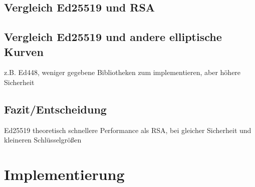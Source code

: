 \documentclass[thesis=bachelor,faculty=cb]{hsmw-thesis}
\begin{document}
\section{Vergleich Ed25519 und RSA}
\section{Vergleich Ed25519 und andere elliptische Kurven}
z.B. Ed448, weniger gegebene Bibliotheken zum implementieren, aber höhere Sicherheit
\section{Fazit/Entscheidung}
Ed25519 theoretisch schnellere Performance als RSA, bei gleicher Sicherheit und kleineren Schlüsselgrößen
\chapter{Implementierung}
\end{document}
